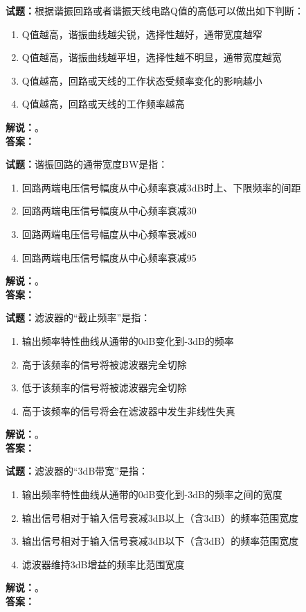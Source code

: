 \documentclass{ctexbook}
\begin{document}
\bigskip




\noindent\textbf{试题：}根据谐振回路或者谐振天线电路Q值的高低可以做出如下判断：
\begin{enumerate}[leftmargin=3em]
\item Q值越高，谐振曲线越尖锐，选择性越好，通带宽度越窄
\item Q值越高，谐振曲线越平坦，选择性越不明显，通带宽度越宽
\item Q值越高，回路或天线的工作状态受频率变化的影响越小
\item Q值越高，回路或天线的工作频率越高
\end{enumerate}
\noindent\textbf{解说：}\textbf{}。\\\noindent\textbf{答案：}

\bigskip




\noindent\textbf{试题：}谐振回路的通带宽度BW是指：
\begin{enumerate}[leftmargin=3em]
\item 回路两端电压信号幅度从中心频率衰减3dB时上、下限频率的间距
\item 回路两端电压信号幅度从中心频率衰减30%
\item 回路两端电压信号幅度从中心频率衰减80%
\item 回路两端电压信号幅度从中心频率衰减95%
\end{enumerate}
\noindent\textbf{解说：}\textbf{}。\\\noindent\textbf{答案：}

\bigskip




\noindent\textbf{试题：}滤波器的“截止频率”是指：
\begin{enumerate}[leftmargin=3em]
\item 输出频率特性曲线从通带的0dB变化到-3dB的频率
\item 高于该频率的信号将被滤波器完全切除
\item 低于该频率的信号将被滤波器完全切除
\item 高于该频率的信号将会在滤波器中发生非线性失真
\end{enumerate}
\noindent\textbf{解说：}\textbf{}。\\\noindent\textbf{答案：}

\bigskip




\noindent\textbf{试题：}滤波器的“3dB带宽”是指：
\begin{enumerate}[leftmargin=3em]
\item 输出频率特性曲线从通带的0dB变化到-3dB的频率之间的宽度
\item 输出信号相对于输入信号衰减3dB以上（含3dB）的频率范围宽度
\item 输出信号相对于输入信号衰减3dB以下（含3dB）的频率范围宽度
\item 滤波器维持3dB增益的频率比范围宽度
\end{enumerate}
\noindent\textbf{解说：}\textbf{}。\\\noindent\textbf{答案：}
\end{document}
